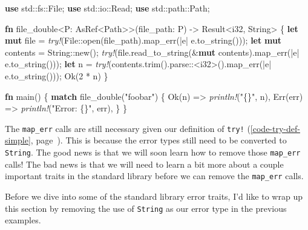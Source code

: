 \documentclass[a4paper,]{book}
\renewcommand*{\hyperref}[2][\ar]{%
  \def\ar{#2}%
  #2 (\autoref{#1}, page~\pageref{#1})}
\newenvironment{Shaded}{\begin{snugshade}}{\end{snugshade}}
\newcommand{\KeywordTok}[1]{\textcolor[rgb]{0.13,0.29,0.53}{\textbf{{#1}}}}
\newcommand{\DataTypeTok}[1]{\textcolor[rgb]{0.13,0.29,0.53}{{#1}}}
\newcommand{\DecValTok}[1]{\textcolor[rgb]{0.00,0.00,0.81}{{#1}}}
\newcommand{\ConstantTok}[1]{\textcolor[rgb]{0.00,0.00,0.00}{{#1}}}
\newcommand{\StringTok}[1]{\textcolor[rgb]{0.31,0.60,0.02}{{#1}}}
\newcommand{\PreprocessorTok}[1]{\textcolor[rgb]{0.56,0.35,0.01}{\textit{{#1}}}}
\newcommand{\NormalTok}[1]{{#1}}
\begin{document}
\begin{Shaded}
\begin{Highlighting}[]
\KeywordTok{use} \NormalTok{std::fs::File;}
\KeywordTok{use} \NormalTok{std::io::Read;}
\KeywordTok{use} \NormalTok{std::path::Path;}

\KeywordTok{fn} \NormalTok{file_double<P: AsRef<Path>>(file_path: P) -> }\DataTypeTok{Result}\NormalTok{<}\DataTypeTok{i32}\NormalTok{, }\DataTypeTok{String}\NormalTok{> \{}
    \KeywordTok{let} \KeywordTok{mut} \NormalTok{file = }\PreprocessorTok{try!}\NormalTok{(File::open(file_path).map_err(|e| e.to_string()));}
    \KeywordTok{let} \KeywordTok{mut} \NormalTok{contents = }\DataTypeTok{String}\NormalTok{::new();}
    \PreprocessorTok{try!}\NormalTok{(file.read_to_string(&}\KeywordTok{mut} \NormalTok{contents).map_err(|e| e.to_string()));}
    \KeywordTok{let} \NormalTok{n = }\PreprocessorTok{try!}\NormalTok{(contents.trim().parse::<}\DataTypeTok{i32}\NormalTok{>().map_err(|e| e.to_string()));}
    \ConstantTok{Ok}\NormalTok{(}\DecValTok{2} \NormalTok{* n)}
\NormalTok{\}}

\KeywordTok{fn} \NormalTok{main() \{}
    \KeywordTok{match} \NormalTok{file_double(}\StringTok{"foobar"}\NormalTok{) \{}
        \ConstantTok{Ok}\NormalTok{(n) => }\PreprocessorTok{println!}\NormalTok{(}\StringTok{"\{\}"}\NormalTok{, n),}
        \ConstantTok{Err}\NormalTok{(err) => }\PreprocessorTok{println!}\NormalTok{(}\StringTok{"Error: \{\}"}\NormalTok{, err),}
    \NormalTok{\}}
\NormalTok{\}}
\end{Highlighting}
\end{Shaded}

The \texttt{map\_err} calls are still necessary given
\hyperref[code-try-def-simple]{our definition of \texttt{try!}}. This is
because the error types still need to be converted to \texttt{String}.
The good news is that we will soon learn how to remove those
\texttt{map\_err} calls! The bad news is that we will need to learn a
bit more about a couple important traits in the standard library before
we can remove the \texttt{map\_err} calls.


Before we dive into some of the standard library error traits, I'd like
to wrap up this section by removing the use of \texttt{String} as our
error type in the previous examples.
\end{document}
